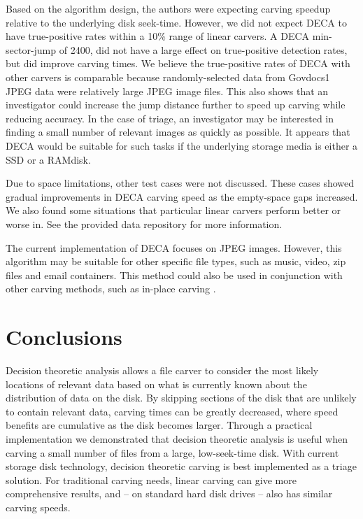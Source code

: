 \documentclass[final,5p,times,twocolumn,authoryear]{elsarticle}
\begin{document}
Based on the algorithm design, the authors were expecting carving speedup relative to the underlying disk seek-time. However, we did not expect DECA to have true-positive rates within a 10\% range of linear carvers. A DECA min-sector-jump of 2400, did not have a large effect on true-positive detection rates, but did improve carving times. We believe the true-positive rates of DECA with other carvers is comparable because randomly-selected data from Govdocs1 JPEG data were relatively large JPEG image files. This also shows that an investigator could increase the jump distance further to speed up carving while reducing accuracy. In the case of triage, an investigator may be interested in finding a small number of relevant images as quickly as possible. It appears that DECA would be suitable for such tasks if the underlying storage media is either a SSD or a RAMdisk.

Due to space limitations, other test cases were not discussed. These cases showed gradual improvements in DECA carving speed as the empty-space gaps increased. We also found some situations that particular linear carvers perform better or worse in. See the provided data repository for more information.

The current implementation of DECA focuses on JPEG images. However, this algorithm may be suitable for other specific file types, such as music, video, zip files and email containers. This method could also be used in conjunction with other carving methods, such as in-place carving \citep{Richard2007inplace, MeijerRob2012}.

\section{Conclusions}
Decision theoretic analysis allows a file carver to consider the most likely locations of relevant data based on what is currently known about the distribution of data on the disk. By skipping sections of the disk that are unlikely to contain relevant data, carving times can be greatly decreased, where speed benefits are cumulative as the disk becomes larger. Through a practical implementation we demonstrated that decision theoretic analysis is useful when carving a small number of files from a large, low-seek-time disk. With current storage disk technology, decision theoretic carving is best implemented as a triage solution. For traditional carving needs, linear carving can give more comprehensive results, and -- on standard hard disk drives -- also has similar carving speeds.
\end{document}
